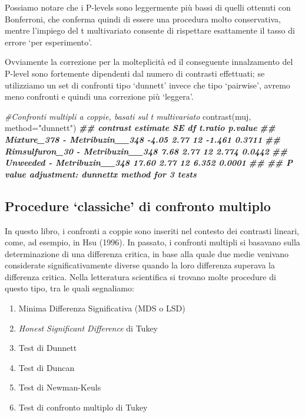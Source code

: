 \documentclass[
  12pt,
]{book}
\newenvironment{Shaded}{\begin{snugshade}}{\end{snugshade}}
\newcommand{\AttributeTok}[1]{\textcolor[rgb]{0.77,0.63,0.00}{#1}}
\newcommand{\CommentTok}[1]{\textcolor[rgb]{0.56,0.35,0.01}{\textit{#1}}}
\newcommand{\DocumentationTok}[1]{\textcolor[rgb]{0.56,0.35,0.01}{\textbf{\textit{#1}}}}
\newcommand{\FunctionTok}[1]{\textcolor[rgb]{0.00,0.00,0.00}{#1}}
\newcommand{\NormalTok}[1]{#1}
\newcommand{\StringTok}[1]{\textcolor[rgb]{0.31,0.60,0.02}{#1}}
\providecommand{\tightlist}{%
  \setlength{\itemsep}{0pt}\setlength{\parskip}{0pt}}
\begin{document}
\normalsize

Possiamo notare che i P-levels sono leggermente più bassi di quelli ottenuti con Bonferroni, che conferma quindi di essere una procedura molto conservativa, mentre l'impiego del t multivariato consente di rispettare esattamente il tasso di errore `per esperimento'.

Ovviamente la correzione per la molteplicità ed il conseguente innalzamento del P-level sono fortemente dipendenti dal numero di contrasti effettuati; se utilizziamo un set di confronti tipo `dunnett' invece che tipo `pairwise', avremo meno confronti e quindi una correzione più `leggera'.

\begin{Shaded}
\begin{Highlighting}[]
\CommentTok{\#Confronti multipli a coppie, basati sul t multivariato}
\FunctionTok{contrast}\NormalTok{(muj, }\AttributeTok{method=}\StringTok{"dunnett"}\NormalTok{)}
\DocumentationTok{\#\#  contrast                         estimate   SE df t.ratio p.value}
\DocumentationTok{\#\#  Mixture\_378 {-} Metribuzin\_\_348       {-}4.05 2.77 12  {-}1.461  0.3711}
\DocumentationTok{\#\#  Rimsulfuron\_30 {-} Metribuzin\_\_348     7.68 2.77 12   2.774  0.0442}
\DocumentationTok{\#\#  Unweeded {-} Metribuzin\_\_348          17.60 2.77 12   6.352  0.0001}
\DocumentationTok{\#\# }
\DocumentationTok{\#\# P value adjustment: dunnettx method for 3 tests}
\end{Highlighting}
\end{Shaded}

\hypertarget{procedure-classiche-di-confronto-multiplo}{%
\subsection{Procedure `classiche' di confronto multiplo}\label{procedure-classiche-di-confronto-multiplo}}

In questo libro, i confronti a coppie sono inseriti nel contesto dei contrasti lineari, come, ad esempio, in Hsu (1996). In passato, i confronti multipli si basavano sulla determinazione di una differenza critica, in base alla quale due medie venivano considerate significativamente diverse quando la loro differenza superava la differenza critica. Nella letteratura scientifica si trovano molte procedure di questo tipo, tra le quali segnaliamo:

\begin{enumerate}
\def\labelenumi{\arabic{enumi}.}
\tightlist
\item
  Minima Differenza Significativa (MDS o LSD)
\item
  \emph{Honest Significant Difference} di Tukey
\item
  Test di Dunnett
\item
  Test di Duncan
\item
  Test di Newman-Keuls
\item
  Test di confronto multiplo di Tukey
\end{enumerate}
\end{document}
